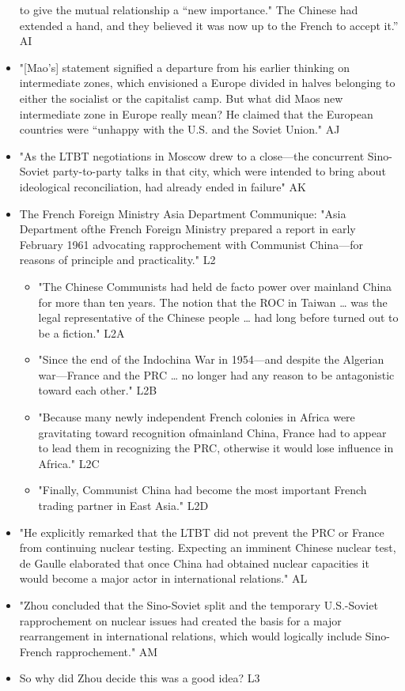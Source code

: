 \documentclass[letterpaper]{article}
\begin{document}
\begin{itemize}
to give the mutual relationship a “new importance." The Chinese had
extended a hand, and they believed it was now up to the French to
accept it.” AI
\item "[Mao's] statement signified a departure from his earlier thinking on
intermediate zones, which envisioned a Europe divided in halves
belonging to either the socialist or the capitalist camp. But what did
Maos new intermediate zone in Europe really mean? He claimed that the
European countries were “unhappy with the U.S. and the Soviet Union."
AJ
\item "As the LTBT negotiations in Moscow drew to a close---the concurrent
Sino-Soviet party-to-party talks in that city, which were intended to
bring about ideological reconciliation, had already ended in failure"
AK
\item The French Foreign Ministry Asia Department Communique: "Asia
Department ofthe French Foreign Ministry prepared a report in early
February 1961 advocating rapprochement with Communist China---for
reasons of principle and practicality." L2

\begin{itemize}
\item "The Chinese Communists had held de facto power over mainland China
for more than ten years. The notion that the ROC in Taiwan \ldots{} was
the legal representative of the Chinese people \ldots{} had long before
turned out to be a fiction." L2A
\item "Since the end of the Indochina War in 1954---and despite the
Algerian war---France and the PRC \ldots{} no longer had any reason to be
antagonistic toward each other." L2B
\item "Because many newly independent French colonies in Africa were
gravitating toward recognition ofmainland China, France had to
appear to lead them in recognizing the PRC, otherwise it would lose
influence in Africa." L2C
\item "Finally, Communist China had become the most important French
trading partner in East Asia." L2D
\end{itemize}

\item "He explicitly remarked that the LTBT did not prevent the PRC or
France from continuing nuclear testing. Expecting an imminent Chinese
nuclear test, de Gaulle elaborated that once China had obtained
nuclear capacities it would become a major actor in international
relations." AL
\item "Zhou concluded that the Sino-Soviet split and the temporary
U.S.-Soviet rapprochement on nuclear issues had created the basis for
a major rearrangement in international relations, which would
logically include Sino-French rapprochement." AM
\item So why did Zhou decide this was a good idea? L3


\end{itemize}
\end{document}
